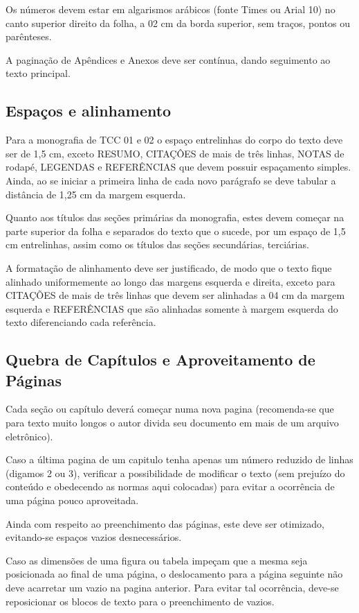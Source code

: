 Os números devem estar em algarismos arábicos (fonte Times ou Arial 10) no 
canto superior direito da folha, a 02 cm da borda superior, sem traços, 
pontos ou parênteses. 

A paginação de Apêndices e Anexos deve ser contínua, dando seguimento ao 
texto principal.

\subsection{Espaços e alinhamento}

Para a monografia de TCC 01 e 02 o espaço entrelinhas do corpo do texto 
deve ser de 1,5 cm, exceto RESUMO, CITAÇÔES de mais de três linhas, NOTAS 
de rodapé, LEGENDAS e REFERÊNCIAS que devem possuir espaçamento simples. 
Ainda, ao se iniciar a primeira linha de cada novo parágrafo se deve 
tabular a distância de 1,25 cm da margem esquerda.

Quanto aos títulos das seções primárias da monografia, estes devem começar 
na parte superior da folha e separados do texto que o sucede, por um espaço 
de 1,5 cm entrelinhas, assim como os títulos das seções secundárias, 
terciárias. 

A formatação de alinhamento deve ser justificado, de modo que o texto fique 
alinhado uniformemente ao longo das margens esquerda e direita, exceto para 
CITAÇÕES de mais de três linhas que devem ser alinhadas a 04 cm da margem 
esquerda e REFERÊNCIAS que são alinhadas somente à margem esquerda do texto 
diferenciando cada referência.

\subsection{Quebra de Capítulos e Aproveitamento de Páginas}

Cada seção ou capítulo deverá começar numa nova pagina (recomenda-se que 
para texto muito longos o autor divida seu documento em mais de um arquivo 
eletrônico). 

Caso a última pagina de um capitulo tenha apenas um número reduzido de 
linhas (digamos 2 ou 3), verificar a possibilidade de modificar o texto 
(sem prejuízo do conteúdo e obedecendo as normas aqui colocadas) para 
evitar a ocorrência de uma página pouco aproveitada.

Ainda com respeito ao preenchimento das páginas, este deve ser otimizado, 
evitando-se espaços vazios desnecessários. 

Caso as dimensões de uma figura ou tabela impeçam que a mesma seja 
posicionada ao final de uma página, o deslocamento para a página seguinte 
não deve acarretar um vazio na pagina anterior. Para evitar tal ocorrência, 
deve-se reposicionar os blocos de texto para o preenchimento de vazios. 

